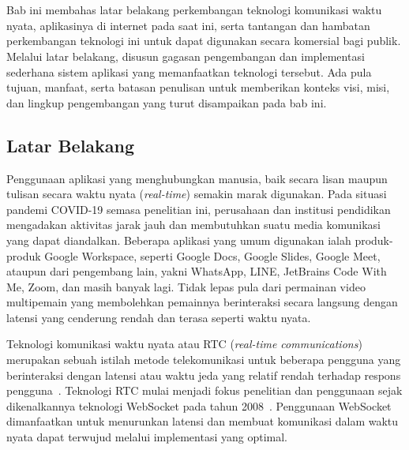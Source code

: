 \chapter{\babSatu}
\label{bab:1}
Bab ini membahas latar belakang perkembangan teknologi komunikasi waktu nyata, aplikasinya di internet pada saat ini, serta tantangan dan hambatan perkembangan teknologi ini untuk dapat digunakan secara komersial bagi publik. Melalui latar belakang, disusun gagasan pengembangan dan implementasi sederhana sistem aplikasi yang memanfaatkan teknologi tersebut. Ada pula tujuan, manfaat, serta batasan penulisan untuk memberikan konteks visi, misi, dan lingkup pengembangan yang turut disampaikan pada bab ini.



\section{Latar Belakang}
\label{sec:latarBelakang}
Penggunaan aplikasi yang menghubungkan manusia, baik secara lisan maupun tulisan secara waktu nyata (\textit{real-time}) semakin marak digunakan. Pada situasi pandemi COVID-19 semasa penelitian ini, perusahaan dan institusi pendidikan mengadakan aktivitas jarak jauh dan membutuhkan suatu media komunikasi yang dapat diandalkan. Beberapa aplikasi yang umum digunakan ialah produk-produk Google Workspace, seperti Google Docs, Google Slides, Google Meet, ataupun dari pengembang lain, yakni WhatsApp, LINE, JetBrains Code With Me, Zoom, dan masih banyak lagi. Tidak lepas pula dari permainan video multipemain yang membolehkan pemainnya berinteraksi secara langsung dengan latensi yang cenderung rendah dan terasa seperti waktu nyata.

Teknologi komunikasi waktu nyata atau RTC (\textit{real-time communications}) merupakan sebuah istilah metode telekomunikasi untuk beberapa pengguna yang berinteraksi dengan latensi atau waktu jeda yang relatif rendah terhadap respons pengguna~\citep{arefin2013modified}. Teknologi RTC mulai menjadi fokus penelitian dan penggunaan sejak dikenalkannya teknologi WebSocket pada tahun 2008~\citep{fette2011websocket, reynolds2008web}. Penggunaan WebSocket dimanfaatkan untuk menurunkan latensi dan membuat komunikasi dalam waktu nyata dapat terwujud melalui implementasi yang optimal.

